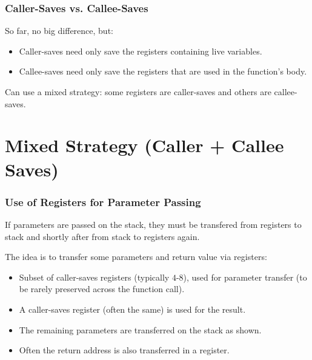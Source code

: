 \documentclass{beamer}
\renewcommand{\emph}[1]{\textcolor{structure}{#1}}
\newcommand{\emp}[1]{\textcolor{DikuRed}{ #1}}
\begin{document}
\begin{frame}
\frametitle{Caller-Saves vs. Callee-Saves}

\bigskip

So far, no big difference, but:\pause\bigskip

\begin{itemize}

\item \emph{Caller-saves} need only save the registers containing live variables.\smallskip

\item \emp{Callee-saves} need only save the registers that are used in the
            function's body.

\end{itemize}

\bigskip

Can use a mixed strategy: some registers are \emph{caller-saves} and others
are \emp{callee-saves}.

\end{frame}


\section{Mixed Strategy (Caller + Callee Saves)}

\begin{frame}[fragile]
	\tableofcontents[currentsection]
\end{frame}


\begin{frame}
\frametitle{Use of Registers for Parameter Passing}

If parameters are passed on the stack, they must be transfered from
registers to stack and shortly after from stack to registers again.

\bigskip

The idea is to transfer some parameters and return value via registers:\smallskip

\begin{itemize}

\item Subset of caller-saves registers (typically $4$-$8$), used for parameter
        transfer (to be rarely preserved across the function call).\smallskip

\item A caller-saves register (often the same) is used for the result.\smallskip


\item The remaining parameters are transferred on the stack as shown.\smallskip

\item Often the return address is also transferred in a register.

\end{itemize}

\end{frame}
\end{document}
